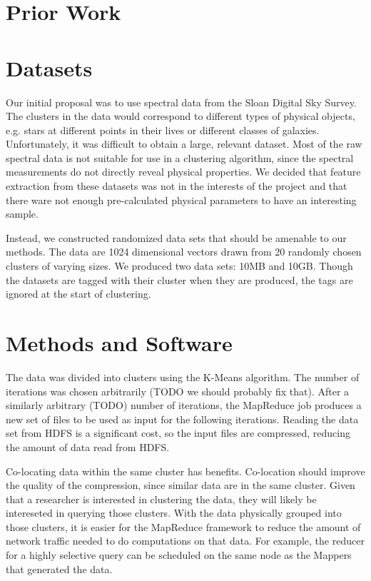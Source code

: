 \documentclass[paper=letter, fontsize=11pt]{scrartcl}
\numberwithin{equation}{section}		%
\numberwithin{figure}{section}			%
\numberwithin{table}{section}				%
\begin{document}
\section{Prior Work}



\section{Datasets}
Our initial proposal was to use spectral data from the Sloan Digital Sky Survey.  The clusters in the data would correspond to different types of physical objects, e.g. stars at different points in their lives or different classes of galaxies.  Unfortunately, it was difficult to obtain a large, relevant dataset.  Most of the raw spectral data is not suitable for use in a clustering algorithm, since the spectral measurements do not directly reveal physical properties.  We decided that feature extraction from these datasets was not in the interests of the project and that there ware not enough pre-calculated physical parameters to have an interesting sample.

Instead, we constructed randomized data sets that should be amenable to our methods.  The data are 1024 dimensional vectors drawn from 20 randomly chosen clusters of varying sizes.  We produced two data sets: 10MB and 10GB.  Though the datasets are tagged with their cluster when they are produced, the tags are ignored at the start of clustering.


\section{Methods and Software}

The data was divided into clusters using the K-Means algorithm.
The number of iterations was chosen arbitrarily (TODO we should probably fix that).
After a similarly arbitrary (TODO) number of iterations, the MapReduce job produces a new set of files to be used as input for the following iterations.
Reading the data set from HDFS is a significant cost, so the input files are compressed, reducing the amount of data read from HDFS.

Co-locating data within the same cluster has benefits.
Co-location should improve the quality of the compression, since similar data are in the same cluster.
Given that a researcher is interested in clustering the data, they will likely be intereseted in querying those clusters.
With the data physically grouped into those clusters, it is easier for the MapReduce framework to reduce the amount of network traffic needed to do computations on that data.  For example, the reducer for a highly selective query can be scheduled on the same node as the Mappers that generated the data.
\end{document}
